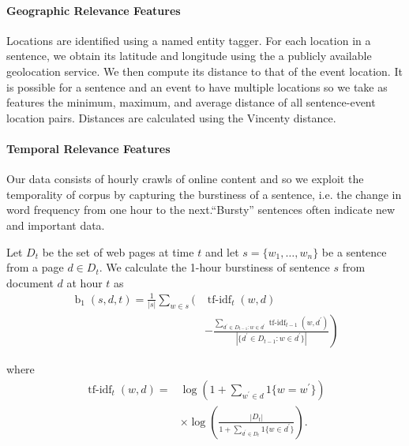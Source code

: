 
\paragraph{Geographic Relevance Features}

Locations are identified using a named entity tagger. For each location in a sentence, we obtain its latitude and longitude using the a publicly available geolocation service.  We then compute its distance to that of the event location.  It is possible for a sentence and an event to have multiple locations so we take as features the minimum, maximum, and average distance of all sentence-event location pairs.  Distances are calculated using the Vincenty distance. 

\paragraph{Temporal Relevance Features}

Our data consists of hourly crawls of online content and so we exploit the temporality of corpus by capturing the burstiness of a sentence, i.e.  the change in word frequency from one hour to the next.``Bursty'' sentences often indicate new and important data. 

Let $D_t$ be the set of web pages at time $t$ and let $s = \{w_1,\ldots,w_n\}$ be a sentence from a page $d \in D_t$.  We calculate the 1-hour burstiness of sentence $s$ from document $d$ at hour $t$  as 
\begin{align*}
\operatorname{b}_1(s,d,t) = \frac{1}{|s|} \sum_{w \in s} \Bigg( &
\operatorname{tf-idf}_t(w,d)  \\ & \left. - \frac{\sum_{d^\prime \in D_{t-1}:
w \in d^\prime } \operatorname{tf-idf}_{t-1}(w,d^\prime)}{|\{d^\prime \in
D_{t-1}: w \in d^\prime\}|} \right) \end{align*}

where \begin{align*} \operatorname{tf-idf}_t(w,d) =&
\log\left(1+\sum_{w^\prime \in d}1\{w=w^\prime\}  \right)\\ & \times
\log\left(\frac{|D_t|}{1 + \sum_{d^\prime \in D_t}1\{w \in d^\prime\}}\right).
\end{align*}


